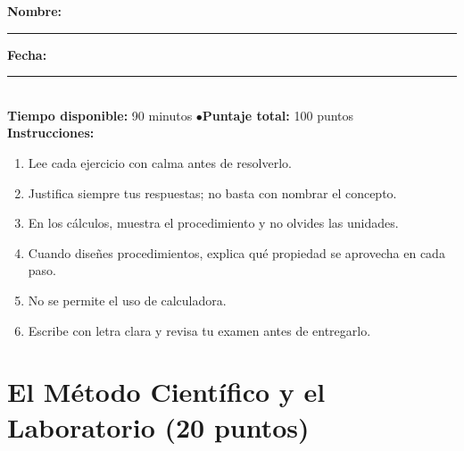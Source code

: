 \documentclass[12pt, letterpaper]{article}
\begin{document}


\vspace{4pt}
\begin{cuadroinfo}
  \small
  \textbf{Nombre:} \rule{0.55\linewidth}{0.4pt} \quad \textbf{Fecha:} \rule{0.15\linewidth}{0.4pt} \\[6pt]
  \textbf{Tiempo disponible:} 90 minutos \quad$\bullet$\quad \textbf{Puntaje total:} 100 puntos \\[4pt]
  \textbf{Instrucciones:}
  \begin{enumerate}[leftmargin=*]
    \item Lee cada ejercicio con calma antes de resolverlo.
    \item Justifica siempre tus respuestas; no basta con nombrar el concepto.
    \item En los cálculos, muestra el procedimiento y no olvides las unidades.
    \item Cuando diseñes procedimientos, explica qué propiedad se aprovecha en cada paso.
    \item No se permite el uso de calculadora.
    \item Escribe con letra clara y revisa tu examen antes de entregarlo.
  \end{enumerate}
\end{cuadroinfo}

\vspace{8pt}

\section{El Método Científico y el Laboratorio (20 puntos)}
\end{document}
